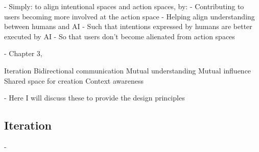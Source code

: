 - Simply: to align intentional spaces and action spaces, by: 
- Contributing to users becoming more involved at the action space
- Helping align understanding between humans and AI
- Such that intentions expressed by humans are better executed by AI
- So that users don't become alienated from action spaces


- Chapter 3, 

Iteration
Bidirectional communication
Mutual understanding 
Mutual influence 
Shared space for creation 
Context awareness 

- Here I will discuss these to provide the design principles

\subsection{Iteration}

- 






